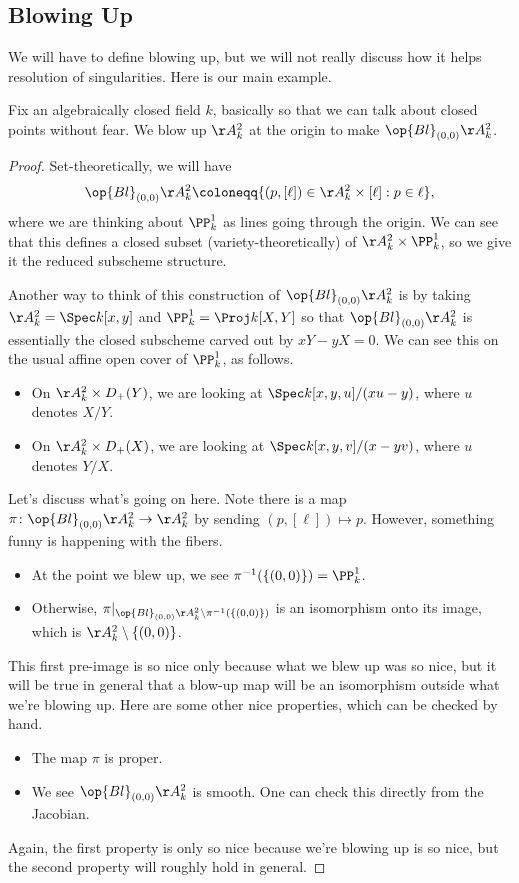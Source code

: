 \documentclass[../notes.tex]{subfiles}
\begin{document}
\subsection{Blowing Up}
We will have to define blowing up, but we will not really discuss how it helps resolution of singularities. Here is our main example.
\begin{exe}
	Fix an algebraically closed field $k$, basically so that we can talk about closed points without fear. We blow up $\AA^2_k$ at the origin to make $\op{Bl}_{(0,0)}\AA^2_k$.
\end{exe}
\begin{proof}
	Set-theoretically, we will have
	\[\op{Bl}_{(0,0)}\AA^2_k\coloneqq\{(p,[\ell])\in\AA^2_k\times[\ell]:p\in\ell\},\]
	where we are thinking about $\PP^1_k$ as lines going through the origin. We can see that this defines a closed subset (variety-theoretically) of $\AA^2_k\times\PP^1_k$, so we give it the reduced subscheme structure.

	Another way to think of this construction of $\op{Bl}_{(0,0)}\AA^2_k$ is by taking $\AA^2_k=\Spec k[x,y]$ and $\PP^1_k=\Proj k[X,Y]$ so that $\op{Bl}_{(0,0)}\AA^2_k$ is essentially the closed subscheme carved out by $xY-yX=0$. We can see this on the usual affine open cover of $\PP^1_k$, as follows.
	\begin{itemize}
		\item On $\AA^2_k\times D_+(Y)$, we are looking at $\Spec k[x,y,u]/(xu-y)$, where $u$ denotes $X/Y$.
		\item On $\AA^2_k\times D_+(X)$, we are looking at $\Spec k[x,y,v]/(x-yv)$, where $u$ denotes $Y/X$.
	\end{itemize}
	Let's discuss what's going on here. Note there is a map $\pi\colon\op{Bl}_{(0,0)}\AA^2_k\to\AA^2_k$ by sending $(p,[\ell])\mapsto p$. However, something funny is happening with the fibers.
	\begin{itemize}
		\item At the point we blew up, we see $\pi^{-1}(\{(0,0)\})=\PP^1_k$.
		\item Otherwise, $\pi|_{\op{Bl}_{(0,0)}\AA^2_k\setminus\pi^{-1}(\{(0,0)\})}$ is an isomorphism onto its image, which is $\AA^2_k\setminus\{(0,0)\}$.
	\end{itemize}
	This first pre-image is so nice only because what we blew up was so nice, but it will be true in general that a blow-up map will be an isomorphism outside what we're blowing up. Here are some other nice properties, which can be checked by hand.
	\begin{itemize}
		\item The map $\pi$ is proper.
		\item We see $\op{Bl}_{(0,0)}\AA^2_k$ is smooth. One can check this directly from the Jacobian.
	\end{itemize}
	Again, the first property is only so nice because we're blowing up is so nice, but the second property will roughly hold in general.
\end{proof}
\end{document}
